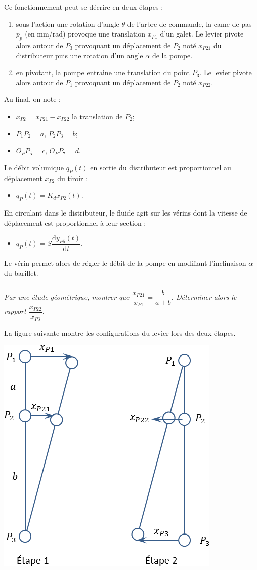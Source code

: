 \documentclass[10pt,fleqn]{article} %
\begin{document}
\begin{multicols}{2}
Ce fonctionnement peut se décrire en deux étapes : 
\begin{enumerate}
\item sous l'action une rotation d'angle $\theta$ de l'arbre de commande, la came de pas $p_p$ (en mm/rad) provoque une translation $x_{P1}$ d'un galet. Le levier pivote alors autour de $P_3$ provoquant un déplacement de $P_2$ noté $x_{P21}$ du distributeur puis une rotation d'un angle $\alpha$ de la pompe.
\item en pivotant, la pompe entraine une translation du point $P_3$. Le levier pivote alors autour de $P_1$ provoquant un déplacement de $P_2$ noté $x_{P22}$.
\end{enumerate}
Au final, on note :
\begin{itemize}
\item $x_{P2}=x_{P21}-x_{P22}$ la translation de $P_2$;
\item $P_1P_2 = a$, $P_2P_3 = b$;
\item $O_PP_5 = c$, $O_PP_7 = d$.
\end{itemize}

Le débit volumique $q_P(t)$ en sortie du distributeur est proportionnel au déplacement $x_{P2}$ du tiroir : 
\begin{itemize}
\item $q_P(t)=K_d x_{P2}(t)$.
\end{itemize}

En circulant dans le distributeur, le fluide agit sur les vérins dont la vitesse de déplacement est proportionnel à leur section : 
\begin{itemize}
\item $q_{P}(t)= S \dfrac{\text{d}y_{P5}(t)}{\text{d}t}$.
\end{itemize}


Le vérin permet alors de régler le débit de la pompe en modifiant l'inclinaison $\alpha$ du barillet.


\subparagraph{}
\textit{Par une étude géométrique, montrer que $\dfrac{x_{P21}}{x_{P1}}=\dfrac{b}{a+b}$. Déterminer alors le rapport $\dfrac{x_{P22}}{x_{P3}}$.}
\begin{corrige}
La figure suivante montre les configurations du levier lors des deux étapes.

\begin{center}
\includegraphics[width=.49\textwidth]{images/Levier}
\end{center}


\end{corrige}
\end{multicols}
\end{document}
